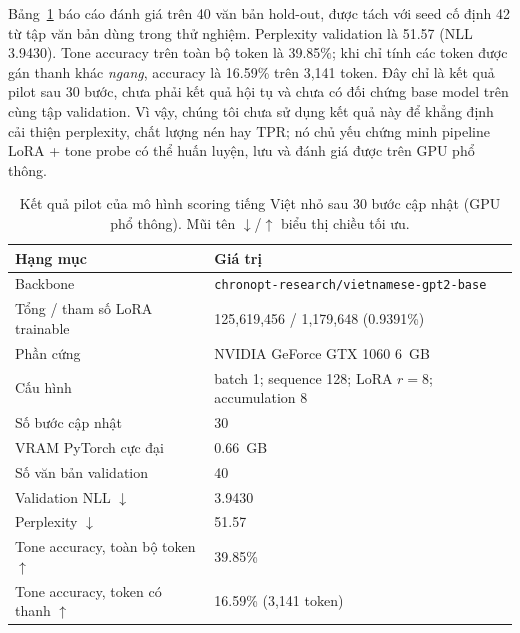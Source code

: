 \documentclass[12pt,a4paper]{article}
\newcommand{\tone}[1]{\textit{#1}}          %
\begin{document}
Bảng~\ref{tab:slm_pilot} báo cáo đánh giá trên 40 văn bản hold-out, được tách với seed cố định 42 từ tập văn bản dùng trong thử nghiệm. Perplexity validation là 51.57 (NLL 3.9430). Tone accuracy trên toàn bộ token là 39.85\%; khi chỉ tính các token được gán thanh khác \tone{ngang}, accuracy là 16.59\% trên 3,141 token. Đây chỉ là kết quả pilot sau 30 bước, chưa phải kết quả hội tụ và chưa có đối chứng base model trên cùng tập validation. Vì vậy, chúng tôi chưa sử dụng kết quả này để khẳng định cải thiện perplexity, chất lượng nén hay TPR; nó chủ yếu chứng minh pipeline LoRA + tone probe có thể huấn luyện, lưu và đánh giá được trên GPU phổ thông.

\begin{table}[H]
\centering
\caption{Kết quả pilot của mô hình scoring tiếng Việt nhỏ sau 30 bước cập nhật (GPU phổ thông). Mũi tên $\downarrow$/$\uparrow$ biểu thị chiều tối ưu.}
\label{tab:slm_pilot}
\begin{tabular}{ll}
\toprule
\textbf{Hạng mục} & \textbf{Giá trị} \\
\midrule
Backbone & \texttt{chronopt-research/vietnamese-gpt2-base} \\
Tổng / tham số LoRA trainable & 125,619,456 / 1,179,648 (0.9391\%) \\
Phần cứng & NVIDIA GeForce GTX 1060 6~GB \\
Cấu hình & batch 1; sequence 128; LoRA $r=8$; accumulation 8 \\
Số bước cập nhật & 30 \\
VRAM PyTorch cực đại & 0.66~GB \\
Số văn bản validation & 40 \\
Validation NLL $\downarrow$ & 3.9430 \\
Perplexity $\downarrow$ & 51.57 \\
Tone accuracy, toàn bộ token $\uparrow$ & 39.85\% \\
Tone accuracy, token có thanh $\uparrow$ & 16.59\% (3,141 token) \\
\bottomrule
\end{tabular}
\end{table}
\end{document}
